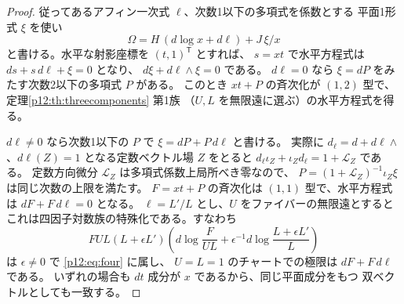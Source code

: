 \begin{proof}
従ってあるアフィン一次式 $\ell$、次数1以下の多項式を係数とする
平面1形式 $\xi$ を使い
\[
 \Omega=H\,(d\log x+d\ell)+J\,\xi/x
\]
と書ける。水平な射影座標を $(t,1)^{\mathsf T}$ とすれば、
$s=xt$ で水平方程式は $ds+s\,d\ell+\xi=0$ となり、
$d\xi+d\ell\wedge\xi=0$ である。
$d\ell=0$ なら $\xi=dP$ をみたす次数2以下の多項式 $P$ がある。
このとき $xt+P$ の斉次化が $(1,2)$ 型で、定理\ref{p12:th:threecomponents} 第1族
（$U,L$ を無限遠に選ぶ）の水平方程式を得る。

$d\ell\ne0$ なら次数1以下の $P$ で $\xi=dP+P\,d\ell$ と書ける。
実際に $d_\ell=d+d\ell\wedge$、$d\ell(Z)=1$ となる定数ベクトル場
$Z$ をとると $d_\ell\iota_Z+\iota_Zd_\ell=1+\mathcal L_Z$ である。
定数方向微分 $\mathcal L_Z$ は多項式係数上局所べき零なので、
$P=(1+\mathcal L_Z)^{-1}\iota_Z\xi$ は同じ次数の上限を満たす。
$F=xt+P$ の斉次化は $(1,1)$ 型で、水平方程式は $dF+F\,d\ell=0$ となる。
$\ell=L'/L$ とし、$U$ をファイバーの無限遠とすると
これは四因子対数族の特殊化である。すなわち
\[
 FUL(L+\epsilon L')\left(
 d\log\frac{F}{UL}+\epsilon^{-1}d\log\frac{L+\epsilon L'}{L}\right)
\]
は $\epsilon\ne0$ で \eqref{p12:eq:four} に属し、
$U=L=1$ のチャートでの極限は $dF+F\,d\ell$ である。
いずれの場合も $dt$ 成分が $x$ であるから、同じ平面成分をもつ
双ベクトルとしても一致する。
\end{proof}

